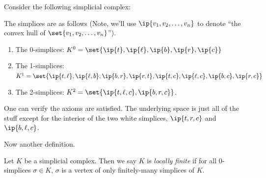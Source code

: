 \begin{example}
  Consider the following simplicial complex:
  \begin{figure}[H]
    \centering
  \end{figure}
  The simplices are as follows (Note, we'll use $\ip{v_1, v_2,
    \ldots, v_n}$ to denote ``the convex hull of $\set{v_1, v_2,
    \ldots, v_n}$'').
  \begin{enumerate}
    \item The 0-simplices: $K^0 = \set{\ip{t}, \ip{\ell}, \ip{b},
      \ip{r}, \ip{c}}$
    \item The 1-simplices: $K^1 = \set{\ip{t,\ell}, \ip{\ell, b},
      \ip{b, r},
      \ip{r, t}, \ip{t,c}, \ip{\ell, c}, \ip{b,c}, \ip{r,c}}$
    \item The 2-simplices: $K^2 = \set{\ip{t,\ell,c},
      \ip{b,r,c}}$.
  \end{enumerate}
  One can verify the axioms are satisfied. The underlying space is
  just all of the stuff except for the interior of the two white
  simplices, $\ip{t,r,c}$ and $\ip{b,\ell, c}$.
\end{example}
Now another definition.
\begin{definition}
  Let $K$ be a simplicial complex. Then we say $K$ is
  \emph{locally finite} if for all 0-simplices $\sigma \in K$,
  $\sigma$ is a vertex of only finitely-many simplices of $K$.
\end{definition}
